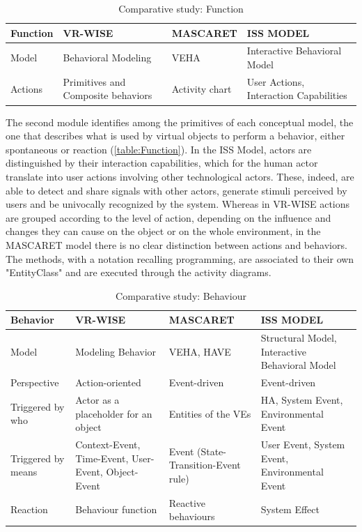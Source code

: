 \begin{table}
\begin{tabular}{|p{2.2cm}|p{3.1cm}|p{3.1cm}|p{3.1cm}|} 
\hline %
\textbf{Function} 
& \textbf{VR-WISE} 
& \textbf{MASCARET}
& \textbf{ISS MODEL} \\ 
\hline
Model
& Behavioral Modeling
& VEHA
& Interactive Behavioral Model \\ 
\hline
Actions
& Primitives and Composite behaviors
& Activity chart
& User Actions, Interaction Capabilities \\ 
\hline
\end{tabular} 
\caption{Comparative study: Function}
\label{table:Function}
\end{table}

The second module identifies among the primitives of each conceptual model, the one that describes what is used by virtual objects to perform a behavior, either spontaneous or reaction (\autoref{table:Function}). In the ISS Model, actors are distinguished by their interaction capabilities, which for the human actor translate into user actions involving other technological actors. These, indeed, are able to detect and share signals with other actors, generate stimuli perceived by users and be univocally recognized by the system. Whereas in VR-WISE actions are grouped according to the level of action, depending on the influence and changes they can cause on the object or on the whole environment, in the MASCARET model there is no clear distinction between actions and behaviors. The methods, with a notation recalling programming, are associated to their own "EntityClass" and are executed through the activity diagrams. 

\begin{table}
\begin{tabular}{|p{2.2cm}|p{3.1cm}|p{3.1cm}|p{3.1cm}|} 
\hline %
\textbf{Behavior} 
& \textbf{VR-WISE} 
& \textbf{MASCARET}
& \textbf{ISS MODEL} \\ 
\hline
Model
& Modeling Behavior 
& VEHA, HAVE
& Structural Model, Interactive Behavioral Model \\ 
\hline
Perspective
& Action-oriented
& Event-driven
& Event-driven \\ 
\hline
Triggered by who
& Actor as a placeholder for an object
& Entities of the VEs
& HA, System Event, Environmental Event \\
\hline
Triggered by means
& Context-Event, Time-Event, User-Event, Object-Event
& Event (State-Transition-Event rule)
& User Event, System Event, Environmental Event \\
\hline
Reaction
& Behaviour function
& Reactive behaviours
& System Effect \\
\hline
\end{tabular} 
\caption{Comparative study: Behaviour}
\label{table:Behaviour}
\end{table}

